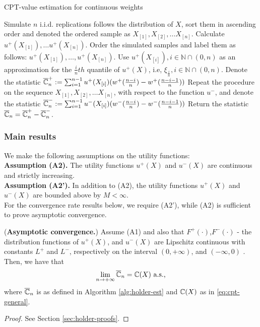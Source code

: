 \begin{algorithm}
\caption{CPT-value estimation for \holder continuous weights}
\label{alg:holder-est}
\begin{algorithmic}[1]
\State Simulate $n$ i.i.d. replications follows the distribution of $X$, sort them in ascending order and denoted the ordered sample as 
$X_{[1]}, X_{[2]}, \ldots X_{[n]}$.
\State Calculate $u^+(X_{[1]}),\ldots u^+(X_{[n]}).$
\State Order the simulated samples and label them as follows: 
$u^+(X_{[1]}),\ldots,u^+(X_{[n]})$.
\State Use $u^+(X_{[i]}), i\in \mathbb{N}\cap (0,n)$ as an approximation for the $\frac{i}{n} th$ quantile of $u^+(X)$, i.e, $\xi_{\frac{i}{n}}, i\in \mathbb{N}\cap (0,n)$.
\State Denote the statistic 
$\overline {\mathbb{C}}_n^+:=\sum_{i=1}^{n-1} u^+(X_{[i]}) (w^+(\frac{n-i}{n})- w^+(\frac{n-i-1}{n}) )$
\State Repeat the procedure on the sequence $X_{[1]}, X_{[2]}, \ldots X_{[n]}$, with respect to the function $u^-$, 
and denote the statistic $\overline {\mathbb{C}}_n^-:=\sum_{i=1}^{n-1} u^-(X_{[i]}) (w^-(\frac{n-i}{n})- w^-(\frac{n-i-1}{n}) ) $
\State Return the statistic $\overline {\mathbb{C}}_n =\overline {\mathbb{C}}_n^+ - \overline {\mathbb{C}}_n^-$.
\end{algorithmic}
\end{algorithm}

\subsubsection*{Main results}
We make the following assumptions on the utility functions:\\[1ex]
\textbf{Assumption (A2).}  The utility functions $u^+(X)$ and $u^-(X)$ are continuous and strictly increasing.\\[1ex]

\textbf{Assumption (A2').}  In addition to (A2), the utility functions $u^+(X)$ and $u^-(X)$ are bounded above by $M<\infty$.\\[1ex]
For the convergence rate results below, we require (A2'), while (A2) is sufficient to prove asymptotic convergence.

\begin{proposition}(\textbf{Asymptotic convergence.})
\label{prop:holder-asymptotic}
Assume (A1) and also that $F^+(\cdot)$,$F^-(\cdot)$ - the distribution functions of $u^+(X)$, and $u^-(X)$ are Lipschitz continuous with constants $L^+$ and $L^-$, respectively on the interval $(0,+\infty)$, and 
$(-\infty, 0)$ . Then, we have that
\begin{align}
\lim_{n\rightarrow +\infty} 
\overline {\mathbb{C}}_n
=
\mathbb{C}(X)
 \text{   a.s.,}
\end{align}
where $\overline {\mathbb{C}}_n$ is as defined in Algorithm \ref{alg:holder-est} and $\mathbb{C}(X)$ as in \eqref{eq:cpt-general}.
\end{proposition}
\begin{proof}
See Section \ref{sec:holder-proofs}.
\end{proof}

